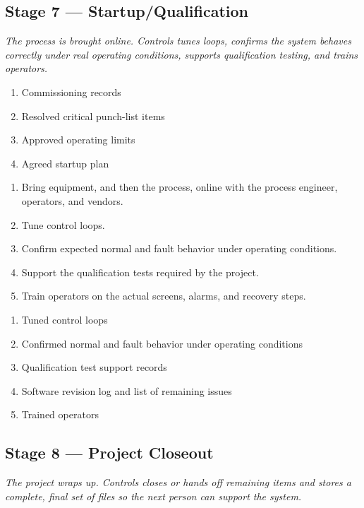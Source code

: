 \subsection{Stage 7 --- Startup/Qualification}
\textit{The process is brought online. Controls tunes loops, confirms the system behaves correctly under real operating conditions, supports qualification testing, and trains operators.}

\begin{enumerate}[itemsep=1pt]
  \item Commissioning records
  \item Resolved critical punch-list items
  \item Approved operating limits
  \item Agreed startup plan
\end{enumerate}

\begin{enumerate}[itemsep=1pt]
  \item Bring equipment, and then the process, online with the process engineer, operators, and vendors.
  \item Tune control loops.
  \item Confirm expected normal and fault behavior under operating conditions.
  \item Support the qualification tests required by the project.
  \item Train operators on the actual screens, alarms, and recovery steps.
\end{enumerate}

\begin{enumerate}[itemsep=1pt]
  \item Tuned control loops
  \item Confirmed normal and fault behavior under operating conditions
  \item Qualification test support records
  \item Software revision log and list of remaining issues
  \item Trained operators
\end{enumerate}

\subsection{Stage 8 --- Project Closeout}
\textit{The project wraps up. Controls closes or hands off remaining items and stores a complete, final set of files so the next person can support the system.}

